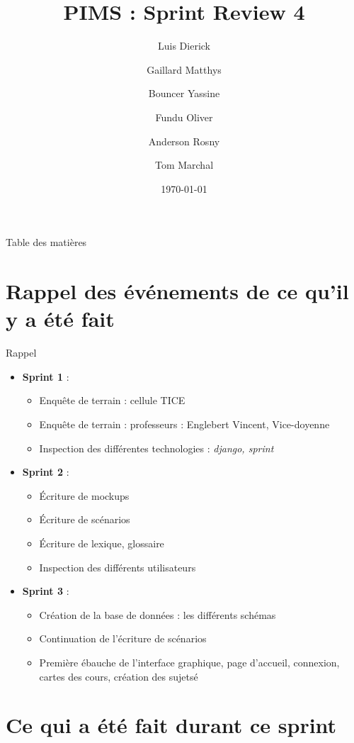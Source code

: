 \documentclass[numbering=fraction]{beamer}
\title{PIMS : Sprint Review 4}
\author[PIMS]{Luis Dierick \and Gaillard Matthys \and Bouncer Yassine \and Fundu Oliver \and Anderson Rosny \and Tom Marchal }
\institute{Université de Namur}
\date{\today}
\begin{document}
\begin{frame}[plain]{}
    \maketitle
\end{frame}

\begin{frame}{Table des matières}
    \tableofcontents
\end{frame}
\section{Rappel des événements de ce qu'il y a été fait}
\begin{frame}{Rappel}
    \begin{itemize}
        \item \textbf{Sprint 1} :
        \begin{itemize}
            \item Enquête de terrain : cellule TICE 
            \item Enquête de terrain : professeurs : Englebert Vincent, Vice-doyenne
            \item Inspection des différentes technologies : \textit{django, sprint}
        \end{itemize}
        \item \textbf{Sprint 2} : 
        \begin{itemize}
            \item Écriture de mockups
            \item Écriture de scénarios
            \item Écriture de lexique, glossaire
            \item Inspection des différents utilisateurs
        \end{itemize}
        \item \textbf{Sprint 3} :
        \begin{itemize}
            \item Création de la base de données : les différents schémas
            \item Continuation de l'écriture de scénarios
            \item Première ébauche de l'interface graphique, page d'accueil, connexion, cartes des cours, création des sujetsé
        \end{itemize}
    \end{itemize}
\end{frame}
\section{Ce qui a été fait durant ce sprint}
\end{document}
